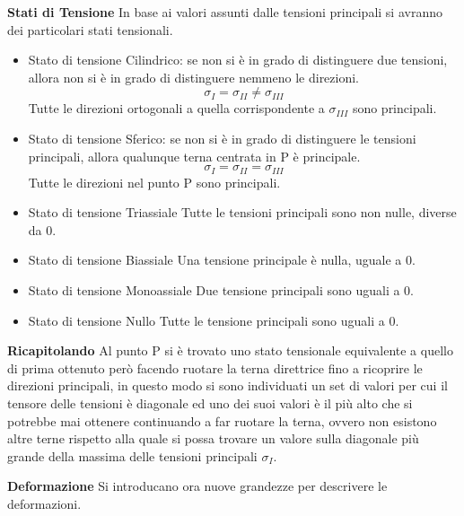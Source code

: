 \documentclass{article}
\begin{document}
\begin{adjustwidth}{2in}{}
  	\textbf{Stati di Tensione}\newline 
  	In base ai valori assunti dalle tensioni principali si avranno dei particolari stati tensionali.  	
  	\begin{itemize}
		\item Stato di tensione Cilindrico: se non si è in grado di distinguere due tensioni, allora non si è in grado di distinguere nemmeno le direzioni.
			 \[ \sigma_I = \sigma_{II} \ne \sigma_{III}\]
			 Tutte le direzioni ortogonali a quella corrispondente a $ \sigma_{III} $ sono principali.
		\item Stato di tensione Sferico: se non si è in grado di distinguere le tensioni principali, allora qualunque terna centrata in P è principale. 
			 \[ \sigma_I = \sigma_{II} = \sigma_{III}\]
			 Tutte le direzioni nel punto P sono principali.
		\item Stato di tensione Triassiale \newline
			  Tutte le tensioni principali sono non nulle, diverse da 0. 
		\item Stato di tensione Biassiale \newline
			  Una tensione principale è nulla, uguale a 0.
		\item Stato di tensione Monoassiale \newline
			  Due tensione principali sono uguali a 0.
		\item Stato di tensione Nullo \newline
			  Tutte le tensione principali sono uguali a 0.
  	\end{itemize}
  	\textbf{Ricapitolando}\newline
  	Al punto P si è trovato uno stato tensionale equivalente a quello di prima ottenuto però facendo ruotare la terna direttrice fino a ricoprire le direzioni principali, in questo modo si sono individuati un set di valori per cui il tensore delle tensioni è diagonale ed uno dei suoi valori è il più alto che si potrebbe mai ottenere continuando a far ruotare la terna, ovvero non esistono altre terne rispetto alla quale si possa trovare un valore sulla diagonale più grande della massima delle tensioni principali $\sigma_I$. \newline 
  	
{\Large \textbf{Deformazione}} \newline 
	Si introducano ora nuove grandezze per descrivere le deformazioni. 
	

\end{adjustwidth}
\end{document}

